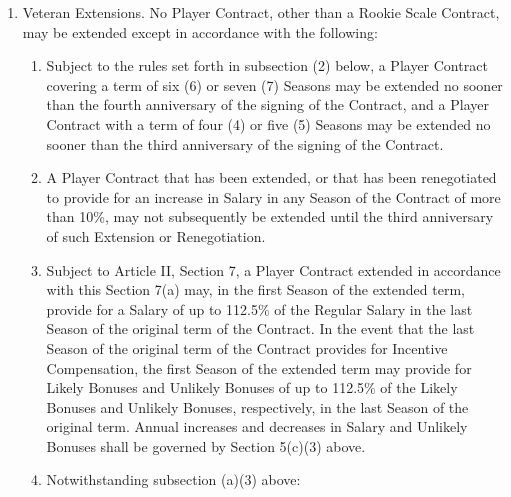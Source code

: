 \documentclass[
]{book}
\providecommand{\tightlist}{%
  \setlength{\itemsep}{0pt}\setlength{\parskip}{0pt}}
\begin{document}
\begin{enumerate}
\def\labelenumi{(\alph{enumi})}
\tightlist
\item
  Veteran Extensions. No Player Contract, other than a Rookie Scale Contract, may be extended except in accordance with the following:

  \begin{enumerate}
  \def\labelenumii{(\arabic{enumii})}
  \tightlist
  \item
    Subject to the rules set forth in subsection (2) below, a Player Contract covering a term of six (6) or seven (7) Seasons may be extended no sooner than the fourth anniversary of the signing of the Contract, and a Player Contract with a term of four (4) or five (5) Seasons may be extended no sooner than the third anniversary of the signing of the Contract.
  \item
    A Player Contract that has been extended, or that has been renegotiated to provide for an increase in Salary in any Season of the Contract of more than 10\%, may not subsequently be extended until the third anniversary of such Extension or Renegotiation.
  \item
    Subject to Article II, Section 7, a Player Contract extended in accordance with this Section 7(a) may, in the first Season of the extended term, provide for a Salary of up to 112.5\% of the Regular Salary in the last Season of the original term of the Contract. In the event that the last Season of the original term of the Contract provides for Incentive Compensation, the first Season of the extended term may provide for Likely Bonuses and Unlikely Bonuses of up to 112.5\% of the Likely Bonuses and Unlikely Bonuses, respectively, in the last Season of the original term. Annual increases and decreases in Salary and Unlikely Bonuses shall be governed by Section 5(c)(3) above.
  \item
    Notwithstanding subsection (a)(3) above:


\end{enumerate}
\end{enumerate}
\end{document}
